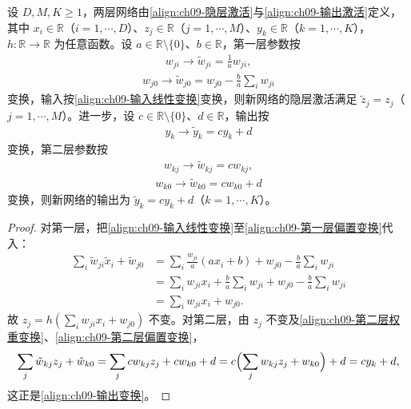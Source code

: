 \documentclass[../../main.tex]{subfiles}
\begin{document}
\begin{proposition}[网络映射的线性变换不变性]\label{proposition:ch09-网络变换不变性}
设 $D,M,K\geqslant1$，两层网络由\eqref{align:ch09-隐层激活}与\eqref{align:ch09-输出激活}定义，其中 $x_{i}\in\mathbb{R}$（$i=1,\cdots,D$）、$z_{j}\in\mathbb{R}$（$j=1,\cdots,M$）、$y_{k}\in\mathbb{R}$（$k=1,\cdots,K$），$h:\mathbb{R}\to\mathbb{R}$ 为任意函数。设 $a\in\mathbb{R}\setminus\{0\}$、$b\in\mathbb{R}$，第一层参数按
\begin{align}
w_{ji}\longrightarrow\tilde{w}_{ji}=\frac{1}{a}w_{ji},
\label{align:ch09-第一层权重变换}
\end{align}
\begin{align}
w_{j0}\longrightarrow\tilde{w}_{j0}=w_{j0}-\frac{b}{a}\sum_{i}w_{ji}
\label{align:ch09-第一层偏置变换}
\end{align}
变换，输入按\eqref{align:ch09-输入线性变换}变换，则新网络的隐层激活满足 $\tilde{z}_{j}=z_{j}$（$j=1,\cdots,M$）。进一步，设 $c\in\mathbb{R}\setminus\{0\}$、$d\in\mathbb{R}$，输出按
\begin{align}
y_{k}\longrightarrow\tilde{y}_{k}=cy_{k}+d
\label{align:ch09-输出变换}
\end{align}
变换，第二层参数按
\begin{align}
w_{kj}\longrightarrow\tilde{w}_{kj}=cw_{kj},
\label{align:ch09-第二层权重变换}
\end{align}
\begin{align}
w_{k0}\longrightarrow\tilde{w}_{k0}=cw_{k0}+d
\label{align:ch09-第二层偏置变换}
\end{align}
变换，则新网络的输出为 $\tilde{y}_{k}=cy_{k}+d$（$k=1,\cdots,K$）。
\end{proposition}

\begin{proof}
对第一层，把\eqref{align:ch09-输入线性变换}至\eqref{align:ch09-第一层偏置变换}代入：
\begin{align*}
\sum_{i}\tilde{w}_{ji}\tilde{x}_{i}+\tilde{w}_{j0}
&=\sum_{i}\frac{w_{ji}}{a}(ax_{i}+b)+w_{j0}-\frac{b}{a}\sum_{i}w_{ji}\\
&=\sum_{i}w_{ji}x_{i}+\frac{b}{a}\sum_{i}w_{ji}+w_{j0}-\frac{b}{a}\sum_{i}w_{ji}\\
&=\sum_{i}w_{ji}x_{i}+w_{j0}.
\end{align*}
故 $z_{j}=h(\sum_{i}w_{ji}x_{i}+w_{j0})$ 不变。对第二层，由 $z_{j}$ 不变及\eqref{align:ch09-第二层权重变换}、\eqref{align:ch09-第二层偏置变换}，
\begin{align*}
\sum_{j}\tilde{w}_{kj}z_{j}+\tilde{w}_{k0}=\sum_{j}cw_{kj}z_{j}+cw_{k0}+d=c\Bigl(\sum_{j}w_{kj}z_{j}+w_{k0}\Bigr)+d=cy_{k}+d,
\end{align*}
这正是\eqref{align:ch09-输出变换}。
\end{proof}
\end{document}
